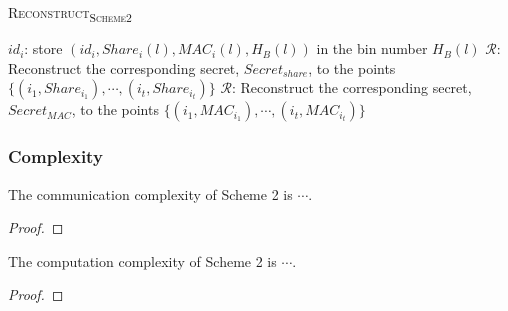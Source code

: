 \begin{algorithm}[h!]
	 \caption[\textsc{Reconstruct\textsubscript{Scheme2}}]{\textsc{Reconstruct\textsubscript{Scheme2}}}\label{alg:S2_Recon}
	 	\begin{algorithmic}[1]
                    \State $id_i$: store $(id_i, Share_i(l), MAC_i(l), H_B(l))$ in the bin number $H_B(l)$
                    \State
	 	        \EndFor
	 	    \EndFor 
	 	            \State $\mathcal{R}$: Reconstruct the corresponding secret, $Secret_{share}$, to the points $\{({i_1}, Share_{i_1}), \cdots, ({i_t}, Share_{i_t})\}$
	 	            \State $\mathcal{R}$: Reconstruct the corresponding secret, $Secret_{MAC}$, to the points $\{({i_1}, MAC_{i_1}), \cdots, ({i_t}, MAC_{i_t})\}$
	 	            \EndIf 
	 	        \EndFor
	 	    \EndFor
	 	\end{algorithmic}
\end{algorithm}

\subsubsection{Complexity}
\begin{theorem}
The communication complexity of Scheme 2 is $\cdots$.
\end{theorem}
\begin{proof}
\end{proof}
\begin{theorem}
The computation complexity of Scheme 2 is $\cdots$.
\end{theorem}
\begin{proof}
\end{proof}
